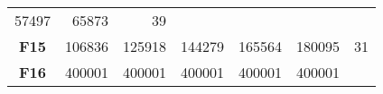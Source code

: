 \documentclass[12pt,a4paper]{article}
\begin{document}
\begin{longtable}[c]{@{}crrrrrr@{}}
\begin{minipage}[t]{0.10\columnwidth}
57497
\strut\end{minipage} &
\begin{minipage}[t]{0.11\columnwidth}\raggedleft\strut
65873
\strut\end{minipage} &
\begin{minipage}[t]{0.07\columnwidth}\raggedleft\strut
39
\strut\end{minipage}\tabularnewline
\begin{minipage}[t]{0.11\columnwidth}\centering\strut
\textbf{F15}
\strut\end{minipage} &
\begin{minipage}[t]{0.08\columnwidth}\raggedleft\strut
106836
\strut\end{minipage} &
\begin{minipage}[t]{0.08\columnwidth}\raggedleft\strut
125918
\strut\end{minipage} &
\begin{minipage}[t]{0.09\columnwidth}\raggedleft\strut
144279
\strut\end{minipage} &
\begin{minipage}[t]{0.10\columnwidth}\raggedleft\strut
165564
\strut\end{minipage} &
\begin{minipage}[t]{0.11\columnwidth}\raggedleft\strut
180095
\strut\end{minipage} &
\begin{minipage}[t]{0.07\columnwidth}\raggedleft\strut
31
\strut\end{minipage}\tabularnewline
\begin{minipage}[t]{0.11\columnwidth}\centering\strut
\textbf{F16}
\strut\end{minipage} &
\begin{minipage}[t]{0.08\columnwidth}\raggedleft\strut
400001
\strut\end{minipage} &
\begin{minipage}[t]{0.08\columnwidth}\raggedleft\strut
400001
\strut\end{minipage} &
\begin{minipage}[t]{0.09\columnwidth}\raggedleft\strut
400001
\strut\end{minipage} &
\begin{minipage}[t]{0.10\columnwidth}\raggedleft\strut
400001
\strut\end{minipage} &
\begin{minipage}[t]{0.11\columnwidth}\raggedleft\strut
400001
\strut\end{minipage} &
\begin{minipage}[t]{0.07\columnwidth}\raggedleft\strut

\end{minipage}
\end{longtable}
\end{document}
